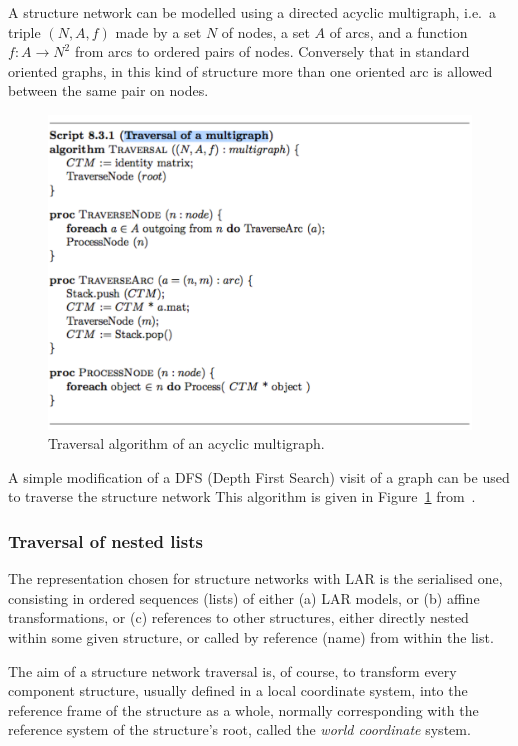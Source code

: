 \documentclass[11pt,oneside]{article}    %
\begin{document}
A structure network can be modelled using a directed acyclic multigraph, i.e.~a triple $(N,A,f)$
made by a set $N$ of nodes, a set $A$ of arcs, and a function $f:A \to N^2$ from arcs to ordered pairs of nodes. Conversely that in standard oriented graphs, in this kind of structure more than one oriented arc is allowed between the same pair on nodes.

\begin{figure}[htbp] %
   \centering
   \includegraphics[width=0.8\linewidth]{images/traversal} 
   \caption{Traversal algorithm of an acyclic multigraph.}
   \label{fig:traversal}
\end{figure}

A simple modification of a DFS (Depth First Search) visit of a graph can be used to traverse the structure network This algorithm is given in Figure~\ref{fig:traversal} from~\cite{Paoluzzi2003a}. 

\subsubsection{Traversal of nested lists}

The representation chosen for structure networks with LAR is the serialised one, consisting in ordered sequences (lists) of either (a) LAR models, or (b) affine transformations, or (c) references to other structures, either directly nested within some given structure, or called by reference (name) from within the list.

The aim of a structure network traversal is, of course, to transform every component structure, usually defined in a local coordinate system, into the reference frame of the structure as a whole, normally corresponding with the reference system of the structure's root, called the \emph{world coordinate} system.
\end{document}
